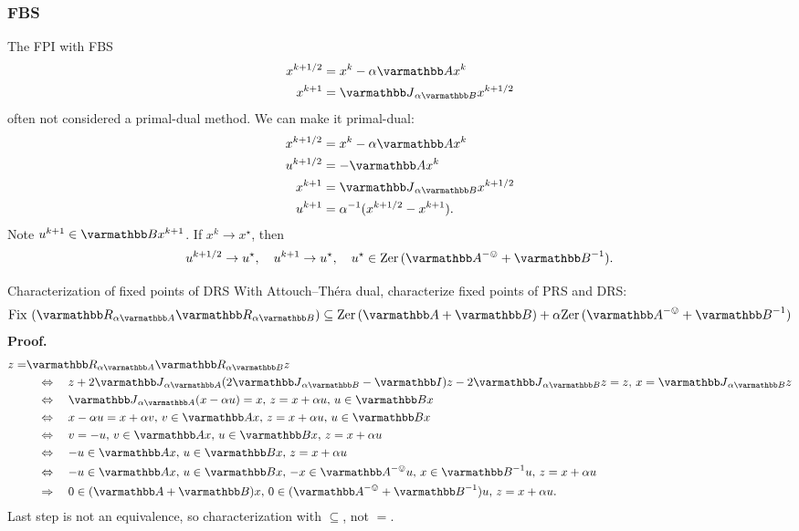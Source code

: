 \documentclass[10pt,mathserif]{beamer}
\begin{document}
\begin{frame}
\frametitle{FBS}
The FPI with FBS
\begin{align*}
x^{k+1/2}&=x^k-\alpha \opA x^k\\
x^{k+1}&=\opJ_{\alpha \opB}x^{k+1/2}
\end{align*}
 often not considered a primal-dual method.
We can make it primal-dual:
\begin{align*}
x^{k+1/2}&=x^k-\alpha \opA x^k\\
u ^{k+1/2}&=-\opA x^k\\
x^{k+1}&=\opJ_{\alpha \opB}x^{k+1/2}\\
u ^{k+1}&=\alpha^{-1}(x^{k+1/2}-x^{k+1}).
\end{align*}
Note $u ^{k+1}\in \opB x^{k+1}$.
If $x^k\rightarrow x^\star$, then
\[
u ^{k+1/2}\rightarrow u ^\star
,\quad
u ^{k+1}\rightarrow u ^\star,\quad
u ^\star\in \zer(\opA^{-\ovee}+\opB^{-1}).
\]
\end{frame}


\begin{frame}{Characterization of fixed points of DRS}
With Attouch--Th\'era dual, characterize fixed points of  PRS and DRS:
\[
\fix\left(\opR_{\alpha \opA}\opR_{\alpha \opB}\right)\subseteq\zer(\opA+\opB)+\alpha \zer(\opA^{-\ovee}+\opB^{-1})
\]
\textbf{Proof.}
\begin{align*}
z=&\opR_{\alpha \opA}\opR_{\alpha \opB}z\\
&\quad\Leftrightarrow\quad z+2\opJ_{\alpha \opA  }(2\opJ_{\alpha \opB }-\opI)z-2\opJ_{\alpha \opB }z=z,\,x=\opJ_{\alpha \opB }z\\
&\quad\Leftrightarrow\quad
\opJ_{\alpha \opA  }(
x-\alpha u  
)=x,\,z=x+\alpha u ,\,u \in \opB x\\
&\quad\Leftrightarrow\quad
x-\alpha u 
=x+\alpha  v ,\, v \in \opA  x,\,z=x+\alpha u ,\,u \in \opB x\\
&\quad\Leftrightarrow\quad
 v =- u ,\, v \in \opA  x,\,
 u \in \opB x,\,z=x+\alpha  u \\
&\quad\Leftrightarrow\quad- u \in \opA  x,\, u \in \opB x,\,z=x+\alpha  u \\
&\quad\Leftrightarrow\quad- u \in \opA  x,\, u \in \opB x
,\,
-x\in \opA  ^{-\ovee} u ,\,x\in \opB ^{-1} u 
,\,z=x+\alpha  u \\
&\quad\Rightarrow\quad
0\in (\opA  +\opB )x,\,
0\in (\opA  ^{-\ovee}+\opB ^{-1}) u ,\,z=x+\alpha  u .
\end{align*}
Last step is not an equivalence, so 
characterization with $\subseteq$, not $=$.
\end{frame}
\end{document}
